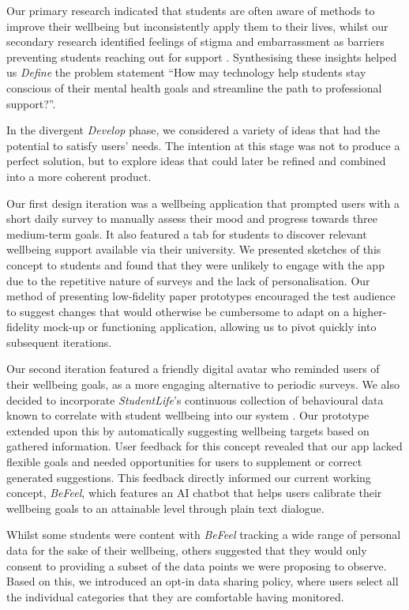 \documentclass[acmsmall, screen, nonacm, 9pt, a4paper,top=2cm,bottom=2cm,left=1cm,right=1cm, marginparwidth=1cm]{acmart}
\begin{document}
Our primary research indicated that students are often aware of methods to improve their wellbeing but inconsistently apply them to their lives, whilst our secondary research identified feelings of stigma and embarrassment as barriers preventing students reaching out for support \cite{MichaelN.Sharpe2004TheEducation}. Synthesising these insights helped us \emph{Define} the problem statement “How may technology help students stay conscious of their mental health goals and streamline the path to professional support?”.

In the divergent \emph{Develop} phase, we considered a variety of ideas that had the potential to satisfy users' needs. The intention at this stage was not to produce a perfect solution, but to explore ideas that could later be refined and combined into a more coherent product.

Our first design iteration was a wellbeing application that prompted users with a short daily survey to manually assess their mood and progress towards three medium-term goals. It also featured a tab for students to discover relevant wellbeing support available via their university. We presented sketches of this concept to students and found that they were unlikely to engage with the app due to the repetitive nature of surveys and the lack of personalisation. Our method of presenting low-fidelity paper prototypes encouraged the test audience to suggest changes that would otherwise be cumbersome to adapt on a higher-fidelity mock-up or functioning application, allowing us to pivot quickly into subsequent iterations.

Our second iteration featured a friendly digital avatar who reminded users of their wellbeing goals, as a more engaging alternative to periodic surveys. We also decided to incorporate \emph{StudentLife}’s continuous collection of behavioural data known to correlate with student wellbeing into our system \cite{Wang2014StudentLife}. Our prototype extended upon this by automatically suggesting wellbeing targets based on gathered information. User feedback for this concept revealed that our app lacked flexible goals and needed opportunities for users to supplement or correct generated suggestions. This feedback directly informed our current working concept, \emph{BeFeel}, which features an AI chatbot that helps users calibrate their wellbeing goals to an attainable level through plain text dialogue.

Whilst some students were content with \emph{BeFeel} tracking a wide range of personal data for the sake of their wellbeing, others suggested that they would only consent to providing a subset of the data points we were proposing to observe. Based on this, we introduced an opt-in data sharing policy, where users select all the individual categories that they are comfortable having monitored. 
\end{document}
